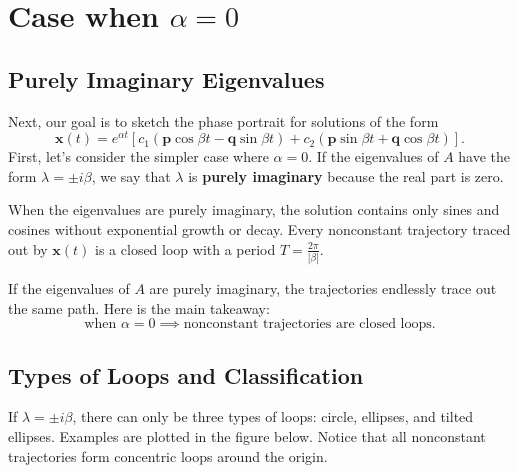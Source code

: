 \documentclass[11pt,letterpaper]{article}
\begin{document}
\section{Case when $\alpha=0$}

\subsection{Purely Imaginary Eigenvalues}
Next, our goal is to sketch the phase portrait for solutions of the form 
$$
\mathbf{x}(t)
=e^{\alpha t}\left[c_1
(\mathbf{p}\cos\beta t-\mathbf{q}\sin\beta t)+c_2
(\mathbf{p}\sin\beta t+\mathbf{q}\cos\beta t)
\right].
$$
First, let's consider the simpler case where $\alpha=0$. If the eigenvalues of $A$ have the form $\lambda=\pm i\beta$, we say that $\lambda$ is \textbf{purely imaginary} because the real part is zero.

When the eigenvalues are purely imaginary, the solution contains only sines and cosines without exponential growth or decay. Every nonconstant trajectory traced out by $\textbf{x}(t)$ is a closed loop with a period $T=\frac{2\pi}{|\beta|}$.

If the eigenvalues of $A$ are purely imaginary, the trajectories endlessly trace out the same path. Here is the main takeaway: 
$$
\boxed{\text{when }\alpha =0\implies\text{nonconstant trajectories are closed loops.}}
$$


\subsection{Types of Loops and Classification}

If $\lambda=\pm i\beta$, there can only be three types of loops: circle, ellipses, and tilted ellipses. Examples are plotted in the figure below. Notice that all nonconstant trajectories form concentric loops around the origin. 
\end{document}
